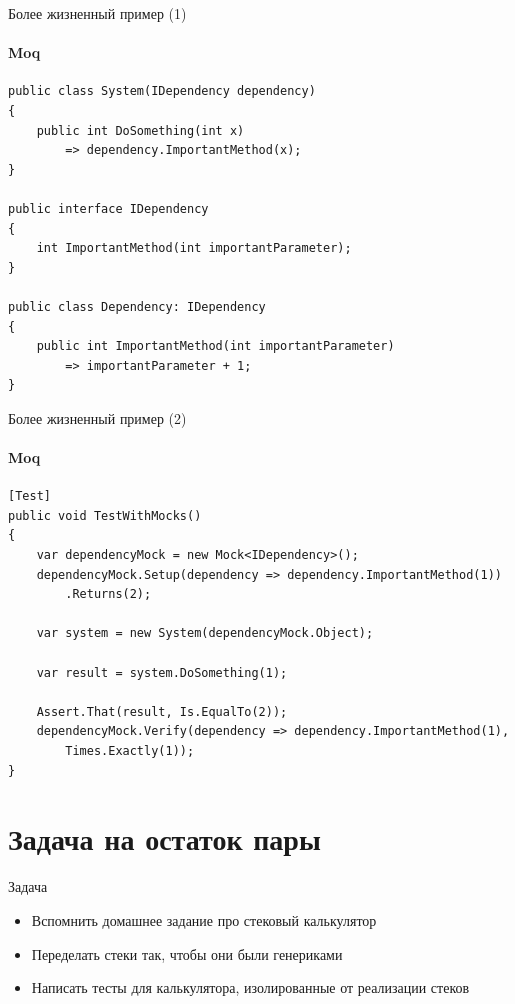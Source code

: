 \documentclass{../../slides-style}
\begin{document}
    \begin{frame}[fragile]{Более жизненный пример (1)}
        \framesubtitle{Moq}
        \begin{small}
            \begin{verbatim}
public class System(IDependency dependency)
{
    public int DoSomething(int x)
        => dependency.ImportantMethod(x);
}

public interface IDependency
{
    int ImportantMethod(int importantParameter);
}

public class Dependency: IDependency
{
    public int ImportantMethod(int importantParameter)
        => importantParameter + 1;
}
            \end{verbatim}
        \end{small}
    \end{frame}

    \begin{frame}[fragile]{Более жизненный пример (2)}
        \framesubtitle{Moq}
        \begin{small}
            \begin{verbatim}
[Test]
public void TestWithMocks()
{
    var dependencyMock = new Mock<IDependency>();
    dependencyMock.Setup(dependency => dependency.ImportantMethod(1))
        .Returns(2);
    
    var system = new System(dependencyMock.Object);

    var result = system.DoSomething(1);

    Assert.That(result, Is.EqualTo(2));
    dependencyMock.Verify(dependency => dependency.ImportantMethod(1), 
        Times.Exactly(1));
}
            \end{verbatim}
        \end{small}
    \end{frame}

    \section{Задача на остаток пары}

    \begin{frame}{Задача}
        \begin{itemize}
            \item Вспомнить домашнее задание про стековый калькулятор
            \item Переделать стеки так, чтобы они были генериками
            \item Написать тесты для калькулятора, изолированные от реализации стеков
        \end{itemize}
    \end{frame}
\end{document}
